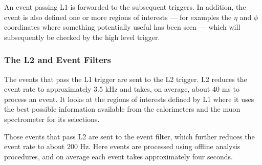 An event passing L1 is forwarded to the subsequent triggers. In addition, the
event is also defined one or more regions of interests --- for examples the
$\eta$ and $\phi$ coordinates where something potentially useful has been seen
--- which will subsequently be checked by the high level trigger.

\subsubsection{The L2 and Event Filters}

The events that pass the L1 trigger are sent to the L2 trigger. L2 reduces the
event rate to approximately $3.5$ kHz and takes, on average, about $40$ ms to
process an event. It looks at the regions of interests defined by L1 where it
uses the best possible information available from the calorimeters and the
muon spectrometer for its selections.

Those events that pass L2 are sent to the event filter, which further reduces
the event rate to about $200$ Hz. Here events are processed using offline
analysis procedures, and on average each event takes approximately four
seconds.





